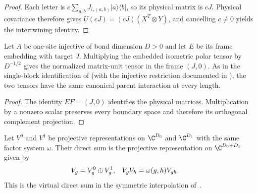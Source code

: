 \begin{proof}\leanok
    Each letter is $c\sum_{a,b}J_{i,(a,b)}|a\rangle\langle b|$,
    so its physical matrix is $cJ$. Physical covariance therefore
    gives $U(cJ)=(cJ)(X^T\otimes Y)$, and cancelling $c\ne0$ yields the
    intertwining identity.
\end{proof}

\begin{lemma}
    \label{thm:spt_polar_fixed_point_parent}
    \leanok

    Let $A$ be one-site injective of bond dimension $D>0$ and
    let $E$ be its frame embedding with target $J$.
    Multiplying the embedded isometric polar tensor by $D^{-1/2}$
    gives the normalized matrix-unit tensor in the frame $(J,0)$.
    As in the single-block identification of
    \cite[Sections~II.C and II.F.2]{Schuch2011Phases} (with the injective
    restriction documented in \cite{gap:spc11_uniform_gap_injective_scope}),
    the two tensors have the same canonical parent interaction at every
    length.
\end{lemma}

\begin{proof}\leanok
    The identity $EF=(J,0)$ identifies the physical matrices.
    Multiplication by a nonzero scalar preserves every boundary space
    and therefore its orthogonal complement projection.
\end{proof}

\begin{definition}
    \label{def:spt_projective_direct_sum}
    \leanok
    Let $V^0$ and $V^1$ be projective representations on
    $\C^{D_0}$ and $\C^{D_1}$ with the same factor system $\omega$.
    Their direct sum is the projective representation on
    $\C^{D_0+D_1}$ given by
    \begin{align}
        V_g    & =V_g^0\oplus V_g^1, &
        V_gV_h & =\omega(g,h)V_{gh}.
        \notag
    \end{align}
    This is the virtual direct sum in the symmetric interpolation
    of~\cite[Section~II.F.2, lines~909--921]{Schuch2011Phases}.
\end{definition}

